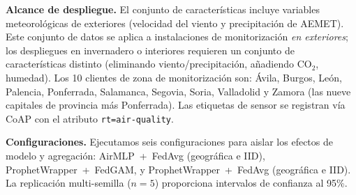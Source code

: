 \documentclass[journal]{IEEEtran}
\begin{document}
\textbf{Alcance de despliegue.} El conjunto de características incluye variables meteorológicas de exteriores (velocidad del viento y precipitación de AEMET). Este conjunto de datos se aplica a instalaciones de monitorización \emph{en exteriores}; los despliegues en invernadero o interiores requieren un conjunto de características distinto (eliminando viento/precipitación, añadiendo CO$_2$, humedad). Los 10 clientes de zona de monitorización son: \'Avila, Burgos, Le\'on, Palencia, Ponferrada, Salamanca, Segovia, Soria, Valladolid y Zamora (las nueve capitales de provincia más Ponferrada). Las etiquetas de sensor se registran vía CoAP con el atributo \texttt{rt=air-quality}.

\textbf{Configuraciones.} Ejecutamos seis configuraciones para aislar los efectos de modelo y agregación: AirMLP~+~FedAvg (geográfica e IID), ProphetWrapper~+~FedGAM, y ProphetWrapper~+~FedAvg (geográfica e IID). La replicación multi-semilla ($n{=}5$) proporciona intervalos de confianza al 95\%.
\end{document}
